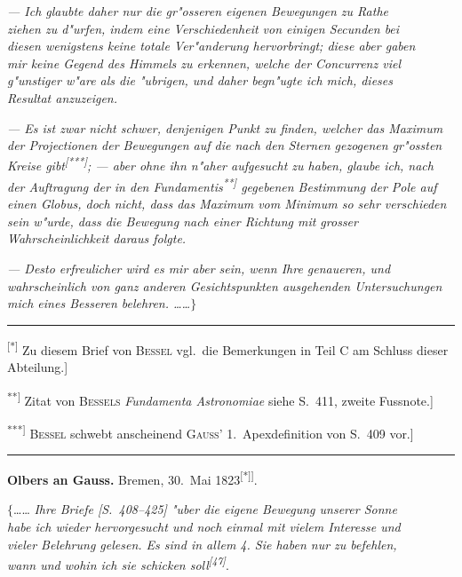 \documentclass[12pt,a4paper]{article}
\theoremstyle{plain}
\theoremstyle{definition}
\theoremstyle{remark}
\begin{document}
{\itshape --- Ich glaubte daher nur die gr"osseren eigenen Bewegungen zu Rathe} \\ {\itshape ziehen zu d"urfen, indem eine Verschiedenheit von einigen Secunden bei} \\ {\itshape diesen wenigstens keine totale Ver"anderung hervorbringt; diese aber gaben} \\ {\itshape mir keine Gegend des Himmels zu erkennen, welche der Concurrenz viel} \\ {\itshape g"unstiger w"are als die "ubrigen, und daher begn"ugte ich mich, dieses} \\ {\itshape Resultat anzuzeigen.}

{\itshape --- Es ist zwar nicht schwer, denjenigen Punkt zu finden, welcher das Maximum der Projectionen der Bewegungen auf die nach den Sternen gezogenen gr"ossten Kreise gibt\textsuperscript{[***]}; --- aber ohne ihn n"aher aufgesucht zu haben, glaube ich, nach der Auftragung der in den {\itshape Fundamentis\textsuperscript{**]}} gegebenen Bestimmung der Pole auf einen Globus, doch nicht, dass das Maximum vom Minimum so sehr verschieden sein w"urde, dass die Bewegung nach einer Richtung mit grosser Wahrscheinlichkeit daraus folgte.}

{\itshape --- Desto erfreulicher wird es mir aber sein, wenn Ihre genaueren, und wahrscheinlich von ganz anderen Gesichtspunkten ausgehenden Untersuchungen mich eines Besseren belehren. \ldots{}\ldots{}$\}$}

\rule{\textwidth}{0.4pt}
{\small
\textsuperscript{[*]} Zu diesem Brief von \textsc{Bessel} vgl.\ die Bemerkungen in Teil C am Schluss dieser Abteilung.]

\textsuperscript{**]} Zitat von \textsc{Bessels} {\itshape Fundamenta Astronomiae} siehe S.\ 411, zweite Fussnote.]

\textsuperscript{***]} \textsc{Bessel} schwebt anscheinend \textsc{Gauss}' 1.\ Apexdefinition von S.\ 409 vor.]
}
\rule{\textwidth}{0.4pt}

\vspace{1em}
\begin{center}
\textbf{Olbers an Gauss.} \quad Bremen, 30.\ Mai 1823\textsuperscript{[*]]}.
\end{center}

\noindent
$\{$\ldots{}\ldots{} {\itshape Ihre Briefe [S.\ 408--425] "uber die eigene Bewegung unserer Sonne} \\ {\itshape habe ich wieder hervorgesucht und noch einmal mit vielem Interesse und} \\ {\itshape vieler Belehrung gelesen. Es sind in allem 4. Sie haben nur zu befehlen,} \\ {\itshape wann und wohin ich sie schicken soll\textsuperscript{[47]}}. 
\end{document}

